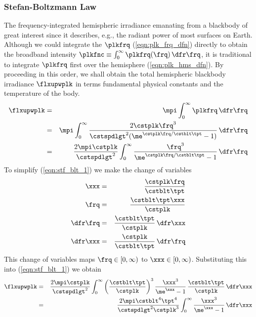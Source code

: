 \documentclass[12pt]{article}
\begin{document}
\subsubsection[Stefan-Boltzmann Law]{Stefan-Boltzmann Law}\label{sxn:stf_blt}
The frequency-integrated hemispheric irradiance emanating from a
blackbody of great interest since it describes, e.g., the radiant
power of most surfaces on Earth. 
Although we could integrate the $\plkfrq$ (\ref{eqn:plk_frq_dfn})
directly to obtain the broadband intensity 
$\plkfnc \equiv \int_{0}^{\infty} \plkfrq(\frq) \,\dfr\frq$,
it is traditional to integrate $\plkfrq$ first over the hemisphere 
(\ref{eqn:plk_hms_dfn}). 
By proceeding in this order, we shall obtain the total hemispheric
blackbody irradiance $\flxupwplk$ in terms fundamental physical
constants and the temperature of the body.
\begin{eqnarray}
\flxupwplk & = & \mpi \int_{0}^{\infty} \plkfrq \,\dfr\frq 
\nonumber \\
& = & \mpi \int_{0}^{\infty} 
\frac{2 \cstplk \frq^{3}}{\cstspdlgt^{2} 
( \me^{\cstplk \frq / \cstblt \tpt} - 1)} \,\dfr\frq
\nonumber \\
& = & \frac{2 \mpi \cstplk}{\cstspdlgt^{2}} 
\int_{0}^{\infty} 
\frac{\frq^{3}}{\me^{\cstplk \frq / \cstblt \tpt} - 1} \,\dfr\frq
\label{eqn:stf_blt_1}
\end{eqnarray}
To simplify (\ref{eqn:stf_blt_1}) we make the change of variables 
\begin{eqnarray}
\xxx & = & \frac{\cstplk \frq}{\cstblt \tpt} \nonumber \\
\frq & = & \frac{\cstblt \tpt \xxx}{\cstplk} \nonumber \\
\dfr\frq & = & \frac{\cstblt \tpt}{\cstplk} \,\dfr\xxx \nonumber \\
\dfr\xxx & = & \frac{\cstplk}{\cstblt \tpt} \,\dfr\frq \nonumber
\label{eqn:cov_x}
\end{eqnarray}
This change of variables maps $\frq \in [0,\infty)$ to
$\xxx \in [0,\infty)$.
Substituting this into (\ref{eqn:stf_blt_1}) we obtain
\begin{eqnarray}
\flxupwplk 
& = & \frac{2 \mpi \cstplk}{\cstspdlgt^{2}} 
\int_{0}^{\infty} 
\left( \frac{\cstblt \tpt}{\cstplk} \right)^{3}
\frac{\xxx^{3}}{\me^{\xxx} - 1} \, \frac{\cstblt \tpt}{\cstplk} \,\dfr\xxx
\nonumber \\
& = & \frac{2 \mpi \cstblt^{4} \tpt^{4} }{\cstspdlgt^{2} \cstplk^{3}} 
\int_{0}^{\infty} 
\frac{\xxx^{3}}{\me^{\xxx} - 1} \,\dfr\xxx
\label{eqn:stf_blt_2}
\end{eqnarray}
\end{document}
